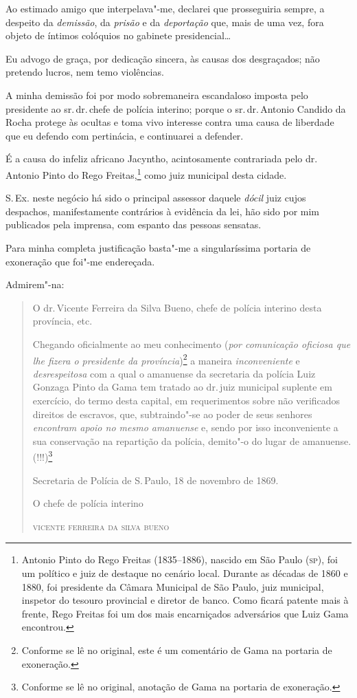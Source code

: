 Ao estimado amigo que interpelava"-me, declarei que prosseguiria sempre,
a despeito da \emph{demissão}, da \emph{prisão} e da \emph{deportação}
que, mais de uma vez, fora objeto de íntimos colóquios no gabinete
presidencial\ldots{}

Eu advogo de graça, por dedicação sincera, às causas dos desgraçados;
não pretendo lucros, nem temo violências.

A minha demissão foi por modo sobremaneira escandaloso imposta pelo
presidente ao sr.\,dr.\,chefe de polícia interino; porque o sr.\,dr.\,Antonio Candido da Rocha protege às ocultas e toma vivo interesse contra
uma causa de liberdade que eu defendo com pertinácia, e continuarei a
defender.

É a causa do infeliz africano Jacyntho, acintosamente contrariada pelo
dr.\,Antonio Pinto do Rego Freitas,\footnote{Antonio Pinto do Rego
  Freitas (1835--1886), nascido em São Paulo (\textsc{sp}), foi um político e juiz
  de destaque no cenário local. Durante as décadas de 1860 e 1880, foi
  presidente da Câmara Municipal de São Paulo, juiz municipal, inspetor
  do tesouro provincial e diretor de banco. Como ficará patente mais à
  frente, Rego Freitas foi um dos mais encarniçados adversários que Luiz
  Gama encontrou.} como juiz municipal desta cidade.

S.\,Ex. neste negócio há sido o principal assessor daquele \emph{dócil}
juiz cujos despachos, manifestamente contrários à evidência da lei, hão
sido por mim publicados pela imprensa, com espanto das pessoas sensatas.

Para minha completa justificação basta"-me a singularíssima portaria de
exoneração que foi"-me endereçada.

Admirem"-na:

\begin{quote}
O dr.\,Vicente Ferreira da Silva Bueno, chefe de polícia interino desta
província, etc.

Chegando oficialmente ao meu conhecimento (\emph{por comunicação
oficiosa que lhe fizera o presidente da província})\footnote{Conforme
  se lê no original, este é um comentário de Gama na portaria de
  exoneração.} a maneira \emph{inconveniente} e \emph{desrespeitosa} com
a qual o amanuense da secretaria da polícia Luiz Gonzaga Pinto da Gama
tem tratado ao dr.\,juiz municipal suplente em exercício, do termo desta
capital, em requerimentos sobre não verificados direitos de escravos,
que, subtraindo"-se ao poder de seus senhores \emph{encontram apoio no
mesmo amanuense} e, sendo por isso inconveniente a sua conservação na
repartição da polícia, demito"-o do lugar de amanuense. (!!!)\footnote{
  Conforme se lê no original, anotação de Gama na portaria de
  exoneração.}\medskip

\noindent{}Secretaria de Polícia de S.\,Paulo, 18 de novembro de 1869.\smallskip

\noindent{}O chefe de polícia interino

\noindent\textsc{vicente ferreira da silva bueno}
\end{quote}

